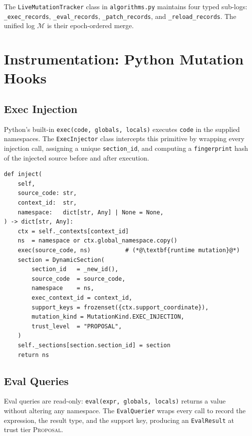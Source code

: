 \documentclass[11pt]{article}
\newcommand{\MutLog}{\mathcal{M}}                %
\begin{document}
The \texttt{LiveMutationTracker} class in \texttt{algorithms.py}
maintains four typed sub-logs: \texttt{\_exec\_records},
\texttt{\_eval\_records}, \texttt{\_patch\_records}, and
\texttt{\_reload\_records}.  The unified log $\MutLog$ is their
epoch-ordered merge.

\section{Instrumentation: Python Mutation Hooks}
\label{sec:instrumentation}

\subsection{Exec Injection}
\label{subsec:exec}

Python's built-in \texttt{exec(code, globals, locals)} executes
\texttt{code} in the supplied namespaces.  The \texttt{ExecInjector}
class intercepts this primitive by wrapping every injection call,
assigning a unique \texttt{section\_id}, and computing a
\texttt{fingerprint} hash of the injected source before and after
execution.

\begin{lstlisting}[style=jugeo-python,
    caption={ExecInjector.inject (exec\_eval\_injection.py, abridged)}]
def inject(
    self,
    source_code: str,
    context_id:  str,
    namespace:   dict[str, Any] | None = None,
) -> dict[str, Any]:
    ctx = self._contexts[context_id]
    ns  = namespace or ctx.global_namespace.copy()
    exec(source_code, ns)          # (*@\textbf{runtime mutation}@*)
    section = DynamicSection(
        section_id   = _new_id(),
        source_code  = source_code,
        namespace    = ns,
        exec_context_id = context_id,
        support_keys = frozenset({ctx.support_coordinate}),
        mutation_kind = MutationKind.EXEC_INJECTION,
        trust_level  = "PROPOSAL",
    )
    self._sections[section.section_id] = section
    return ns
\end{lstlisting}

\subsection{Eval Queries}
\label{subsec:eval}

Eval queries are read-only: \texttt{eval(expr, globals, locals)}
returns a value without altering any namespace.  The
\texttt{EvalQuerier} wraps every call to record the expression, the
result type, and the support key, producing an \texttt{EvalResult}
at trust tier \textsc{Proposal}.
\end{document}
